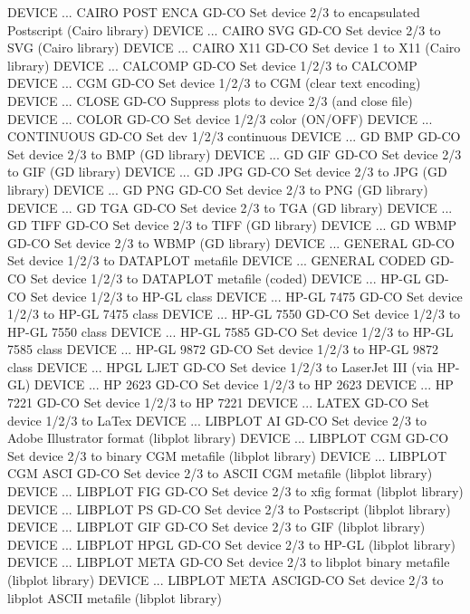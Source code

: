 DEVICE ... CAIRO POST ENCA  GD-CO Set device 2/3 to encapsulated Postscript (Cairo library)
DEVICE ... CAIRO SVG        GD-CO Set device 2/3 to SVG (Cairo library)
DEVICE ... CAIRO X11        GD-CO Set device 1 to X11 (Cairo library)
DEVICE ... CALCOMP          GD-CO Set device 1/2/3 to CALCOMP
DEVICE ... CGM              GD-CO Set device 1/2/3 to CGM (clear text encoding)
DEVICE ... CLOSE            GD-CO Suppress plots to device 2/3 (and close file)
DEVICE ... COLOR            GD-CO Set device 1/2/3 color (ON/OFF)
DEVICE ... CONTINUOUS       GD-CO Set dev 1/2/3 continuous
DEVICE ... GD BMP           GD-CO Set device 2/3 to BMP (GD library)
DEVICE ... GD GIF           GD-CO Set device 2/3 to GIF (GD library)
DEVICE ... GD JPG           GD-CO Set device 2/3 to JPG (GD library)
DEVICE ... GD PNG           GD-CO Set device 2/3 to PNG (GD library)
DEVICE ... GD TGA           GD-CO Set device 2/3 to TGA (GD library)
DEVICE ... GD TIFF          GD-CO Set device 2/3 to TIFF (GD library)
DEVICE ... GD WBMP          GD-CO Set device 2/3 to WBMP (GD library)
DEVICE ... GENERAL          GD-CO Set device 1/2/3 to DATAPLOT metafile
DEVICE ... GENERAL CODED    GD-CO Set device 1/2/3 to DATAPLOT metafile (coded)
DEVICE ... HP-GL            GD-CO Set device 1/2/3 to HP-GL class
DEVICE ... HP-GL 7475       GD-CO Set device 1/2/3 to HP-GL 7475 class
DEVICE ... HP-GL 7550       GD-CO Set device 1/2/3 to HP-GL 7550 class
DEVICE ... HP-GL 7585       GD-CO Set device 1/2/3 to HP-GL 7585 class
DEVICE ... HP-GL 9872       GD-CO Set device 1/2/3 to HP-GL 9872 class
DEVICE ... HPGL LJET        GD-CO Set device 1/2/3 to LaserJet III (via HP-GL)
DEVICE ... HP 2623          GD-CO Set device 1/2/3 to HP 2623
DEVICE ... HP 7221          GD-CO Set device 1/2/3 to HP 7221
DEVICE ... LATEX            GD-CO Set device 1/2/3 to LaTex
DEVICE ... LIBPLOT AI       GD-CO Set device 2/3 to Adobe Illustrator format (libplot library)
DEVICE ... LIBPLOT CGM      GD-CO Set device 2/3 to binary CGM metafile (libplot library)
DEVICE ... LIBPLOT CGM ASCI GD-CO Set device 2/3 to ASCII CGM metafile (libplot library)
DEVICE ... LIBPLOT FIG      GD-CO Set device 2/3 to xfig format (libplot library)
DEVICE ... LIBPLOT PS       GD-CO Set device 2/3 to Postscript (libplot library)
DEVICE ... LIBPLOT GIF      GD-CO Set device 2/3 to GIF (libplot library)
DEVICE ... LIBPLOT HPGL     GD-CO Set device 2/3 to HP-GL (libplot library)
DEVICE ... LIBPLOT META     GD-CO Set device 2/3 to libplot binary metafile (libplot library)
DEVICE ... LIBPLOT META ASCIGD-CO Set device 2/3 to libplot ASCII metafile (libplot library)
